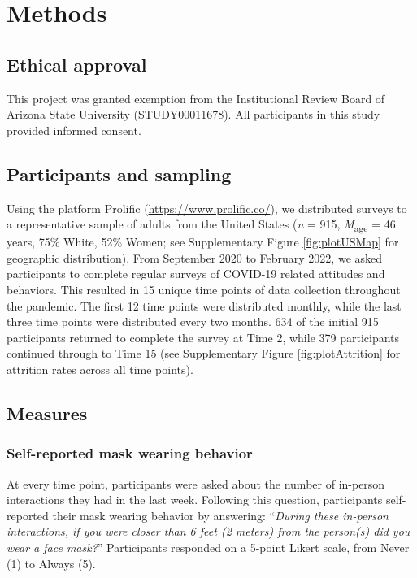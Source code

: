 \documentclass[
  english,
  man,floatsintext]{apa6}
\begin{document}
\hypertarget{methods}{%
\section{Methods}\label{methods}}

\hypertarget{ethical-approval}{%
\subsection{Ethical approval}\label{ethical-approval}}

This project was granted exemption from the Institutional Review Board of Arizona State University (STUDY00011678). All participants in this study provided informed consent.

\hypertarget{participants-and-sampling}{%
\subsection{Participants and sampling}\label{participants-and-sampling}}

Using the platform Prolific (\url{https://www.prolific.co/}), we distributed surveys to a representative sample of adults from the United States (\emph{n} = 915, \emph{M}\textsubscript{age} = 46 years, 75\% White, 52\% Women; see Supplementary Figure \ref{fig:plotUSMap} for geographic distribution). From September 2020 to February 2022, we asked participants to complete regular surveys of COVID-19 related attitudes and behaviors. This resulted in 15 unique time points of data collection throughout the pandemic. The first 12 time points were distributed monthly, while the last three time points were distributed every two months. 634 of the initial 915 participants returned to complete the survey at Time 2, while 379 participants continued through to Time 15 (see Supplementary Figure \ref{fig:plotAttrition} for attrition rates across all time points).

\hypertarget{measures}{%
\subsection{Measures}\label{measures}}

\hypertarget{self-reported-mask-wearing-behavior}{%
\subsubsection{Self-reported mask wearing behavior}\label{self-reported-mask-wearing-behavior}}

At every time point, participants were asked about the number of in-person interactions they had in the last week. Following this question, participants self-reported their mask wearing behavior by answering: ``\emph{During these in-person interactions, if you were closer than 6 feet (2 meters) from the person(s) did you wear a face mask?}'' Participants responded on a 5-point Likert scale, from Never (1) to Always (5).
\end{document}

